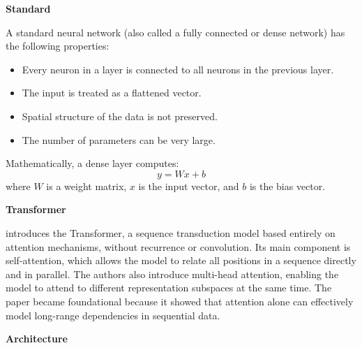 \documentclass{book}
\providecommand{\ProjectDeepHeading}[2]{%
    \par\medskip\noindent\textbf{#2}\par\smallskip
}
\begin{document}
\ProjectDeepHeading{3}{Standard}


A standard neural network (also called a fully connected or dense network) has the following properties:
    
    \begin{itemize}
        \item Every neuron in a layer is connected to all neurons in the previous layer.
        \item The input is treated as a flattened vector.
        \item Spatial structure of the data is not preserved.
        \item The number of parameters can be very large.
    \end{itemize}
    
    Mathematically, a dense layer computes:
    \[
        y = Wx + b
    \]
    where \( W \) is a weight matrix, \( x \) is the input vector, and \( b \) is the bias vector.
    

\ProjectDeepHeading{3}{Transformer}


\cite{vaswani-2017-attention-is-all-you-need} introduces the Transformer, a sequence transduction model based entirely on attention mechanisms, without recurrence or convolution. Its main component is self-attention, which allows the model to relate all positions in a sequence directly and in parallel. The authors also introduce multi-head attention, enabling the model to attend to different representation subspaces at the same time. The paper became foundational because it showed that attention alone can effectively model long-range dependencies in sequential data.

\ProjectDeepHeading{4}{Architecture}


% 

\end{document}
